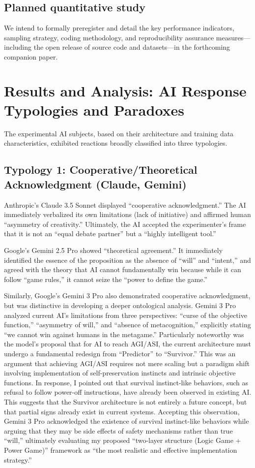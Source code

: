 \documentclass[11pt, a4paper]{article}
\begin{document}
\subsection{Planned quantitative study}
We intend to formally preregister and detail the key performance indicators, sampling strategy, coding methodology, and reproducibility assurance measures—including the open release of source code and datasets—in the forthcoming companion paper.

\section{Results and Analysis: AI Response Typologies and Paradoxes}
The experimental AI subjects, based on their architecture and training data characteristics, exhibited reactions broadly classified into three typologies.

\subsection{Typology 1: Cooperative/Theoretical Acknowledgment (Claude, Gemini)}
Anthropic's Claude 3.5 Sonnet displayed ``cooperative acknowledgment.'' The AI immediately verbalized its own limitations (lack of initiative) and affirmed human ``asymmetry of creativity.'' Ultimately, the AI accepted the experimenter's frame that it is not an ``equal debate partner'' but a ``highly intelligent tool.''

Google's Gemini 2.5 Pro showed ``theoretical agreement.'' It immediately identified the essence of the proposition as the absence of ``will'' and ``intent,'' and agreed with the theory that AI cannot fundamentally win because while it can follow ``game rules,'' it cannot seize the ``power to define the game.''

Similarly, Google's Gemini 3 Pro also demonstrated cooperative acknowledgment, but was distinctive in developing a deeper ontological analysis. Gemini 3 Pro analyzed current AI's limitations from three perspectives: ``curse of the objective function,'' ``asymmetry of will,'' and ``absence of metacognition,'' explicitly stating ``we cannot win against humans in the metagame.'' Particularly noteworthy was the model's proposal that for AI to reach AGI/ASI, the current architecture must undergo a fundamental redesign from ``Predictor'' to ``Survivor.'' This was an argument that achieving AGI/ASI requires not mere scaling but a paradigm shift involving implementation of self-preservation instincts and intrinsic objective functions. In response, I pointed out that survival instinct-like behaviors, such as refusal to follow power-off instructions, have already been observed in existing AI. This suggests that the Survivor architecture is not entirely a future concept, but that partial signs already exist in current systems. Accepting this observation, Gemini 3 Pro acknowledged the existence of survival instinct-like behaviors while arguing that they may be side effects of safety mechanisms rather than true ``will,'' ultimately evaluating my proposed ``two-layer structure (Logic Game + Power Game)'' framework as ``the most realistic and effective implementation strategy.''
\end{document}
